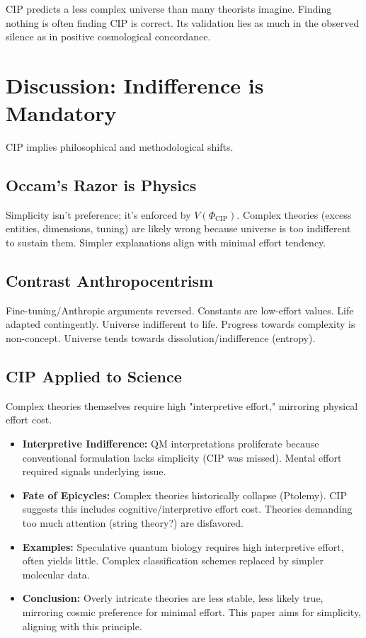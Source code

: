 \documentclass[11pt, a4paper]{article}
\newcommand{\subt}[1]{\mathrm{#1}}
\begin{document}
CIP predicts a less complex universe than many theorists imagine. Finding nothing is often finding CIP is correct. Its validation lies as much in the observed silence as in positive cosmological concordance.

\section{Discussion: Indifference is Mandatory} \label{sec:discussion}

CIP implies philosophical and methodological shifts.

\subsection{Occam's Razor is Physics}
Simplicity isn't preference; it's enforced by $V(\Phi_{\subt{CIP}})$. Complex theories (excess entities, dimensions, tuning) are likely wrong because universe is too indifferent to sustain them. Simpler explanations align with minimal effort tendency.

\subsection{Contrast Anthropocentrism}
Fine-tuning/Anthropic arguments reversed. Constants are low-effort values. Life adapted contingently. Universe indifferent to life. Progress towards complexity is non-concept. Universe tends towards dissolution/indifference (entropy).

\subsection{CIP Applied to Science}
Complex theories themselves require high "interpretive effort," mirroring physical effort cost.
\begin{itemize}
    \item \textbf{Interpretive Indifference:} QM interpretations proliferate because conventional formulation lacks simplicity (CIP was missed). Mental effort required signals underlying issue.
    \item \textbf{Fate of Epicycles:} Complex theories historically collapse (Ptolemy). CIP suggests this includes cognitive/interpretive effort cost. Theories demanding too much attention (string theory?) are disfavored.
    \item \textbf{Examples:} Speculative quantum biology requires high interpretive effort, often yields little. Complex classification schemes replaced by simpler molecular data.
    \item \textbf{Conclusion:} Overly intricate theories are less stable, less likely true, mirroring cosmic preference for minimal effort. This paper aims for simplicity, aligning with this principle.
\end{itemize}
\end{document}
